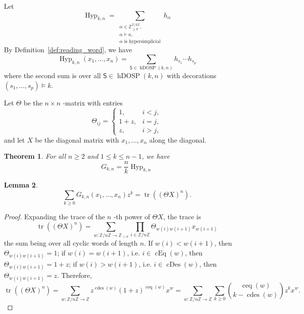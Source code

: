 \documentclass[10pt,a4paper]{amsart}
\theoremstyle{plain}
\newtheorem{theorem}{Theorem}[section]
\newtheorem{lemma}[theorem]{Lemma}
\theoremstyle{definition}
\newcommand{\Z}{\mathbb{Z}}
\newcommand{\dosp}{\mathsf{S}}
\DeclareMathOperator{\Hyp}{Hyp}
\DeclareMathOperator{\cEq}{cEq}
\DeclareMathOperator{\cDes}{cDes}
\DeclareMathOperator{\hDOSP}{hDOSP}
\DeclareMathOperator{\tr}{tr}
\DeclareMathOperator{\cdes}{cdes}
\DeclareMathOperator{\ceq}{ceq}
\begin{document}
Let
\begin{equation}\label{eq:Hypkn}
	\Hyp_{k,n}= \sum_{\substack{\alpha \in \Z_{\geq0}^{\Z/k\Z}, \\ \alpha \models n, \\ \alpha \text{ is hypersimplicial}}} h_{\alpha}
\end{equation}
By Definition~\ref{def:reading_word}, we have
\begin{equation}
	\Hyp_{k,n}(x_1,\dots,x_n) = \sum_{\dosp \in \hDOSP(k,n)} h_{s_1}\cdots h_{s_p}
\end{equation}
where the second sum is over all $\dosp \in \hDOSP(k,n)$ with decorations $(s_1,\dots,s_p) \models k$.

Let $ \Theta $ be the $ n \times n $ -matrix with entries
\begin{equation}
	\Theta_{ij}=
	\begin{cases}
		1,   & i<j, \\
		1+z, & i=j, \\
		z,   & i>j,
	\end{cases}
\end{equation}
and let $ X $ be the diagonal matrix with $ x_1,\dots,x_n $ along the diagonal.

\begin{theorem}\label{thm:GHyp}
	For all $n \geq 2$ and $1 \leq k \leq n-1$, we have
	\begin{equation}
		G_{k,n}= \frac{n}{k} \Hyp_{k,n}
	\end{equation}
\end{theorem}

\begin{lemma}\label{lem:Gtrace}
	\begin{equation}
		\sum_{k \geq 0} G_{k,n}(x_1,\dots,x_n) z^k = \tr((\Theta X)^n).
	\end{equation}
\end{lemma}

\begin{proof}
	Expanding the trace of the $ n $ -th power of $ \Theta X $, the trace is
	\begin{equation}
		\tr((\Theta X)^n) = \sum_{w: \Z/n\Z \to \Z_{>0}} \prod_{i \in \Z/n\Z} \Theta_{w(i)w(i+1)} x_{w(i+1)}
	\end{equation}
	the sum being over all cyclic words of length $ n $. If $ w(i) < w(i+1) $, then $
		\Theta_{w(i)w(i+1)} = 1 $; if $ w(i) = w(i+1) $, i.e. $ i \in \cEq(w) $, then $
		\Theta_{w(i)w(i+1)} = 1+z $; if $ w(i) > w(i+1) $, i.e. $ i \in \cDes(w) $, then $
		\Theta_{w(i)w(i+1)} = z $. Therefore,
	\begin{equation}
		\tr((\Theta X)^n) = \sum_{w: \Z/n\Z \to \Z} z^{\cdes(w)} (1+z)^{\ceq(w)} x^w = \sum_{w: \Z/n\Z \to \Z} \sum_{k \geq 0} \binom{\ceq(w)}{k-\cdes(w)} z^k x^w.
	\end{equation}
\end{proof}
\end{document}
